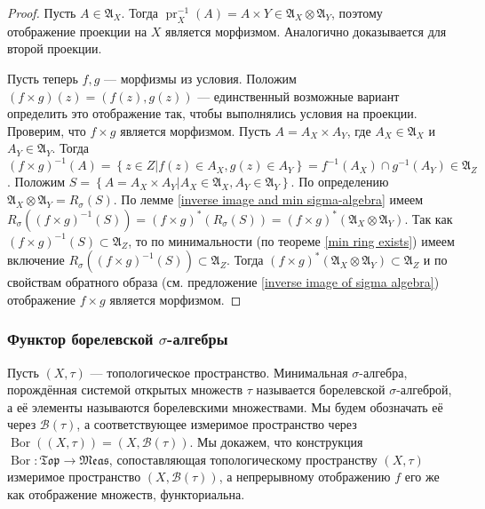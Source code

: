 \documentclass[12pt]{article}
\numberwithin{theorem}{section}
\theoremstyle{definition}
\newcommand{\defin}[2]{\hypertarget{#2}{{\color{red} #1}}}
\newcommand{\setsigmaalg}{\mathfrak{A}}
\newcommand{\calB}{\mathcal{B}}
\newcommand{\pr}{\operatorname{pr}}
\newcommand{\Bor}{\operatorname{Bor}}
\newcommand{\Top}{\mathfrak{Top}}
\newcommand{\Meas}{\mathfrak{Meas}}
\newcommand{\defineset}[2]{\left\{
	\left.
	#1
	\right\vert
	#2
	\right\}}
\begin{document}
	\begin{proof}
		Пусть $ A \in \setsigmaalg_X $. Тогда $ \pr_X^{-1}(A) = A \times Y \in \setsigmaalg_X \otimes \setsigmaalg_Y $,
		поэтому отображение проекции на $ X $ является морфизмом. Аналогично доказывается для второй проекции.
		
		Пусть теперь $ f, g $ --- морфизмы из условия. Положим $ (f \times g)(z) = (f(z), g(z)) $ 
		--- единственный возможные вариант определить это отображение так, чтобы выполнялись условия на проекции.
		Проверим, что $ f \times g $ является морфизмом.
		Пусть $ A = A_X \times A_Y $, где $ A_X \in \setsigmaalg_X $ и $ A_Y \in \setsigmaalg_Y $. 
		Тогда $ (f \times g)^{-1}(A) = \defineset{z \in Z}{f(z) \in A_X, g(z) \in A_Y} 
		= f^{-1}(A_X) \cap g^{-1}(A_Y) \in \setsigmaalg_Z $.
		Положим $ S = \defineset{A = A_X \times A_Y}{A_X \in \setsigmaalg_X, A_Y \in \setsigmaalg_Y} $.
		По определению $ \setsigmaalg_X \otimes \setsigmaalg_Y = R_{\sigma}(S) $.
		По лемме \ref{inverse image and min sigma-algebra} имеем 
		$ R_{\sigma}((f \times g)^{-1}(S)) = (f \times g)^*(R_{\sigma}(S)) = (f \times g)^*(\setsigmaalg_X \otimes \setsigmaalg_Y) $.
		Так как $ (f \times g)^{-1}(S) \subset \setsigmaalg_Z $, 
		то по минимальности (по теореме \ref{min ring exists}) 
		имеем включение $ R_{\sigma}((f \times g)^{-1}(S)) \subset \setsigmaalg_Z $.
		Тогда $ (f \times g)^*(\setsigmaalg_X \otimes \setsigmaalg_Y) \subset \setsigmaalg_Z $ и 
		по свойствам обратного образа (см. предложение \ref{inverse image of sigma algebra})
		отображение $ f \times g $ является морфизмом.
	\end{proof}
	
	\subsubsection{Функтор борелевской $ \sigma $-алгебры}
	
	Пусть $ (X, \tau) $ --- топологическое пространство.
	Минимальная $ \sigma $-алгебра, порождённая системой открытых множеств $ \tau $ 
	называется \defin{борелевской $ \sigma $-алгеброй}{borel-sigma-algebra},
	а её элементы называются \defin{борелевскими множествами}{borel-sets}.
	Мы будем обозначать её через $ \calB(\tau) $, а соответствующее измеримое пространство
	через $ \Bor((X, \tau)) = (X, \calB(\tau)) $.
	Мы докажем, что конструкция $ \Bor \colon \Top \to \Meas $, сопоставляющая топологическому пространству $ (X, \tau) $
	измеримое пространство $ (X, \calB(\tau)) $, а непрерывному отображению $ f $
	его же как отображение множеств, функториальна.
	
\end{document}
